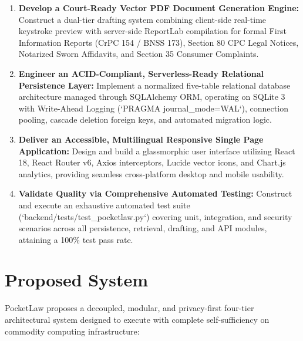 \begin{enumerate}
    \item \textbf{Develop a Court-Ready Vector PDF Document Generation Engine:}
    Construct a dual-tier drafting system combining client-side real-time keystroke preview with server-side ReportLab compilation for formal First Information Reports (CrPC 154 / BNSS 173), Section 80 CPC Legal Notices, Notarized Sworn Affidavits, and Section 35 Consumer Complaints.
    
    \item \textbf{Engineer an ACID-Compliant, Serverless-Ready Relational Persistence Layer:}
    Implement a normalized five-table relational database architecture managed through SQLAlchemy ORM, operating on SQLite 3 with Write-Ahead Logging (`PRAGMA journal_mode=WAL`), connection pooling, cascade deletion foreign keys, and automated migration logic.
    
    \item \textbf{Deliver an Accessible, Multilingual Responsive Single Page Application:}
    Design and build a glassmorphic user interface utilizing React 18, React Router v6, Axios interceptors, Lucide vector icons, and Chart.js analytics, providing seamless cross-platform desktop and mobile usability.
    
    \item \textbf{Validate Quality via Comprehensive Automated Testing:}
    Construct and execute an exhaustive automated test suite (`backend/tests/test_pocketlaw.py`) covering unit, integration, and security scenarios across all persistence, retrieval, drafting, and API modules, attaining a 100\% test pass rate.
\end{enumerate}

\section{Proposed System}
\label{sec:proposed_system}

PocketLaw proposes a decoupled, modular, and privacy-first four-tier architectural system designed to execute with complete self-sufficiency on commodity computing infrastructure:

